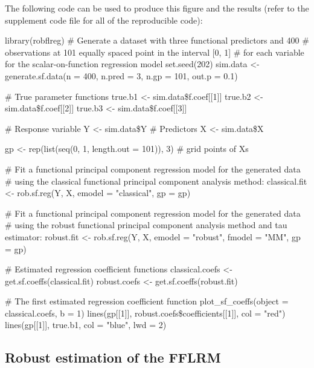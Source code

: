 The following code can be used to produce this figure and the results (refer to the supplement code file for all of the reproducible code):
\begin{smallexample}
\begin{smallverbatim}
library(robflreg)
# Generate a dataset with three functional predictors and 400
# observations at 101 equally spaced point in the interval [0, 1]
# for each variable for the scalar-on-function regression model
set.seed(202)
sim.data <- generate.sf.data(n = 400, n.pred = 3, n.gp = 101, out.p = 0.1)

# True parameter functions
true.b1 <- sim.data\$f.coef[[1]]
true.b2 <- sim.data\$f.coef[[2]]
true.b3 <- sim.data\$f.coef[[3]]

# Response variable
Y <- sim.data\$Y
# Predictors
X <- sim.data\$X

gp <- rep(list(seq(0, 1, length.out = 101)), 3) # grid points of Xs

# Fit a functional principal component regression model for the generated data
# using the classical functional principal component analysis method:
classical.fit <- rob.sf.reg(Y, X, emodel = "classical", gp = gp)

# Fit a functional principal component regression model for the generated data
# using the robust functional principal component analysis method and tau estimator:
robust.fit <- rob.sf.reg(Y, X, emodel = "robust", fmodel = "MM", gp = gp)

# Estimated regression coefficient functions
classical.coefs <- get.sf.coeffs(classical.fit)
robust.coefs <- get.sf.coeffs(robust.fit)

# The first estimated regression coefficient function
plot_sf_coeffs(object = classical.coefs, b = 1)
lines(gp[[1]], robust.coefs\$coefficients[[1]], col = "red")
lines(gp[[1]], true.b1, col = "blue", lwd = 2)
\end{smallverbatim}
\end{smallexample}

\subsection*{Robust estimation of the FFLRM}

